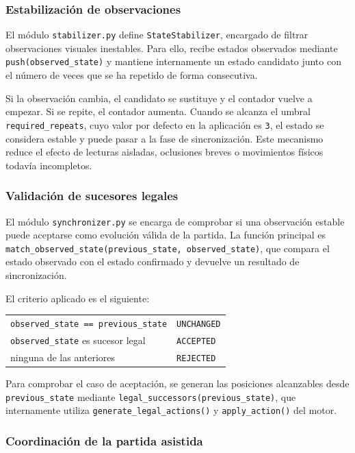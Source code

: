 \subsubsection{Estabilización de observaciones}

El módulo \texttt{stabilizer.py} define \texttt{StateStabilizer}, encargado de filtrar observaciones visuales inestables. Para ello, recibe estados observados mediante \texttt{push(observed\_state)} y mantiene internamente un estado candidato junto con el número de veces que se ha repetido de forma consecutiva.

Si la observación cambia, el candidato se sustituye y el contador vuelve a empezar. Si se repite, el contador aumenta. Cuando se alcanza el umbral \texttt{required\_repeats}, cuyo valor por defecto en la aplicación es \texttt{3}, el estado se considera estable y puede pasar a la fase de sincronización. Este mecanismo reduce el efecto de lecturas aisladas, oclusiones breves o movimientos físicos todavía incompletos.

\subsubsection{Validación de sucesores legales}

El módulo \texttt{synchronizer.py} se encarga de comprobar si una observación estable puede aceptarse como evolución válida de la partida. La función principal es \texttt{match\_observed\_state(previous\_state, observed\_state)}, que compara el estado observado con el estado confirmado y devuelve un resultado de sincronización.

El criterio aplicado es el siguiente:

\begin{center}
\begin{tabular}{ll}
\texttt{observed\_state == previous\_state} & \texttt{UNCHANGED} \\
\texttt{observed\_state} es sucesor legal & \texttt{ACCEPTED} \\
ninguna de las anteriores & \texttt{REJECTED}
\end{tabular}
\end{center}

Para comprobar el caso de aceptación, se generan las posiciones alcanzables desde \texttt{previous\_state} mediante \texttt{legal\_successors(previous\_state)}, que internamente utiliza \texttt{generate\_legal\_actions()} y \texttt{apply\_action()} del motor.

\subsubsection{Coordinación de la partida asistida}

